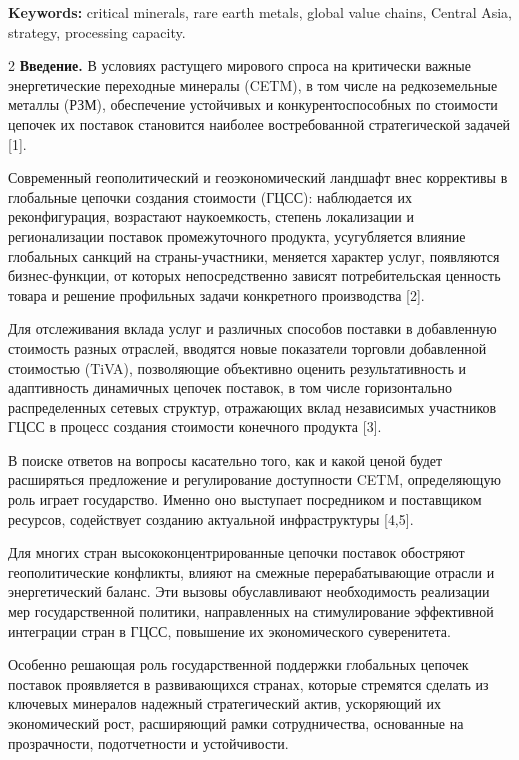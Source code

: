 {\bfseries Keywords:} critical minerals, rare earth metals, global value
chains, Central Asia, strategy, processing capacity.

\begin{multicols}{2}
{\bfseries Введение.} В условиях растущего мирового спроса на критически
важные энергетические переходные минералы (CETM), в том числе на
редкоземельные металлы (РЗМ), обеспечение устойчивых и
конкурентоспособных по стоимости цепочек их поставок становится наиболее
востребованной стратегической задачей {[}1{]}.

Современный геополитический и геоэкономический ландшафт внес коррективы
в глобальные цепочки создания стоимости (ГЦСС): наблюдается их
реконфигурация, возрастают наукоемкость, степень локализации и
регионализации поставок промежуточного продукта, усугубляется влияние
глобальных санкций на страны-участники, меняется характер услуг,
появляются бизнес-функции, от которых непосредственно зависят
потребительская ценность товара и решение профильных задачи конкретного
производства {[}2{]}.

Для отслеживания вклада услуг и различных способов поставки в
добавленную стоимость разных отраслей, вводятся новые показатели
торговли добавленной стоимостью (TiVA), позволяющие объективно оценить
результативность и адаптивность динамичных цепочек поставок, в том числе
горизонтально распределенных сетевых структур, отражающих вклад
независимых участников ГЦСС в процесс создания стоимости конечного
продукта {[}3{]}.

В поиске ответов на вопросы касательно того, как и какой ценой будет
расширяться предложение и регулирование доступности CETM, определяющую
роль играет государство. Именно оно выступает посредником и поставщиком
ресурсов, содействует созданию актуальной инфраструктуры {[}4,5{]}.

Для многих стран высококонцентрированные цепочки поставок обостряют
геополитические конфликты, влияют на смежные перерабатывающие отрасли и
энергетический баланс. Эти вызовы обуславливают необходимость реализации
мер государственной политики, направленных на стимулирование эффективной
интеграции стран в ГЦСС, повышение их экономического суверенитета.

Особенно решающая роль государственной поддержки глобальных цепочек
поставок проявляется в развивающихся странах, которые стремятся сделать
из ключевых минералов надежный стратегический актив, ускоряющий их
экономический рост, расширяющий рамки сотрудничества, основанные на~
прозрачности, подотчетности и устойчивости.~


\end{multicols}
